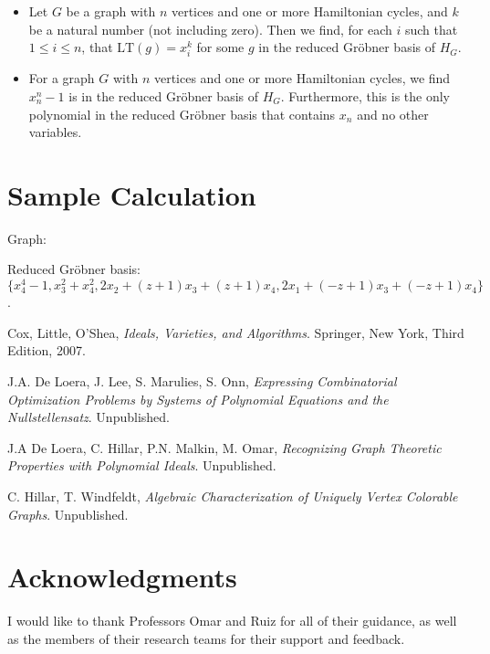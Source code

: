 \documentclass[thesis]{hmcposter}
\renewcommand{\(}{\left(}
\renewcommand{\)}{\right)}
\newcommand{\<}{\langle}
\renewcommand{\>}{\rangle}
\newcommand{\ds}[1]{$ \displaystyle #1 $}
\begin{document}
\begin{poster}
\begin{itemize}
	\item Let $G$ be a graph with $n$ vertices and one or more Hamiltonian cycles, and $k$ be a natural number (not including zero). Then we find, for each $i$ such that $1 \leq i \leq n$, that $\mathrm{LT}(g) = x_i^k$ for some $g$ in the reduced Gr\"obner basis of $H_G$.\\
	\item For a graph $G$ with $n$ vertices and one or more Hamiltonian cycles, we find $x_n^n - 1$ is in the reduced Gr\"obner basis of $H_G$. Furthermore, this is the only polynomial in the reduced Gr\"obner basis that contains $x_n$ and no other variables.
\end{itemize}

\section{Sample Calculation}

Graph:
\begin{center}
\end{center}

Reduced Gr\"obner basis: \ds{\{x_4^4-1, x_3^2+x_4^2, 2x_2+(z+1)x_3+(z+1)x_4, 2x_1+(-z+1)x_3+(-z+1)x_4\}}.


\begin{thebibliography}{9}

	Cox, Little, O'Shea,
	\emph{Ideals, Varieties, and Algorithms}.
	Springer, New York,
	Third Edition,
	2007.

	J.A. De Loera, J. Lee, S. Marulies, S. Onn,
	\emph{Expressing Combinatorial Optimization Problems by Systems of Polynomial Equations and the Nullstellensatz}.
	Unpublished.

	J.A De Loera, C. Hillar, P.N. Malkin, M. Omar,
	\emph{Recognizing Graph Theoretic Properties with Polynomial Ideals}.
	Unpublished.

	C. Hillar, T. Windfeldt,
	\emph{Algebraic Characterization of Uniquely Vertex Colorable Graphs}.
	Unpublished.

\end{thebibliography}

\vfill

\section{Acknowledgments}

I would like to thank Professors Omar and Ruiz for all of their guidance, as well as the members of their research teams for their support and feedback.

\vfill
\end{poster}
\end{document}

